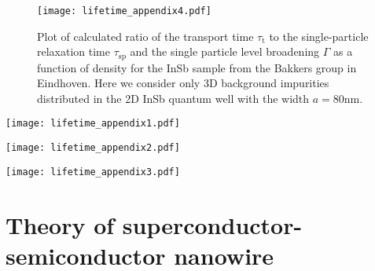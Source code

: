 \documentclass[aps,prmaterials,twocolumn,superscriptaddress,longbibliography]{revtex4-2}
\begin{document}
\begin{figure}[!htb]
  \centering
  \texttt{[image: lifetime\_appendix4.pdf]}
  \caption{Plot of calculated ratio of the transport time $\tau_\mathrm{t}$ to the single-particle relaxation time $\tau_\mathrm{sp}$ and the single particle level broadening $\Gamma$ as a function of density for the InSb sample from the Bakkers group in Eindhoven. Here we consider only 3D background impurities distributed in the 2D InSb quantum well with the width $a=80\mathrm{nm}$. }
  \label{fig:gamma_InSb}
\end{figure}

\begin{figure*}[!htb]
  \centering
  \texttt{[image: lifetime\_appendix1.pdf]}
  \caption{Plot of the calculated ratio of the transport time $\tau_\mathrm{t}$ to the single-particle relaxation time $\tau_\mathrm{sp}$ and the single-particle level broadening $\Gamma$ as a function of density for InAs sample from the Krogstrup group in the Copenhagen. Here we consider only the remote surface impurities at the dielectric interface placed 10 nm away from the surface of the 2D InAs quantum well layer. }
  \label{fig:gamma_InAs1}
\end{figure*}

\begin{figure*}[!htb]
  \centering
  \texttt{[image: lifetime\_appendix2.pdf]}
  \caption{Same as Fig.~\ref{fig:gamma_InAs1}, but here we consider only background impurities uniformly distributed in the 2D InAs quantum well with the width $a=30\mathrm{nm}$. }
  \label{fig:gamma_InAs2}
\end{figure*}
\begin{figure*}[!htb]
  \centering
  \texttt{[image: lifetime\_appendix3.pdf]}
  \caption{Same as Fig.~\ref{fig:gamma_InAs1}, but here we consider only remote impurities uniformly distributed in the oxide(Al$_2$O$_3$) layer with the width $a_\mathrm{oxide}=8\mathrm{nm}$. }
  \label{fig:gamma_InAs3}
\end{figure*}

\section{Theory of superconductor-semiconductor nanowire}\label{app:D}
\end{document}

